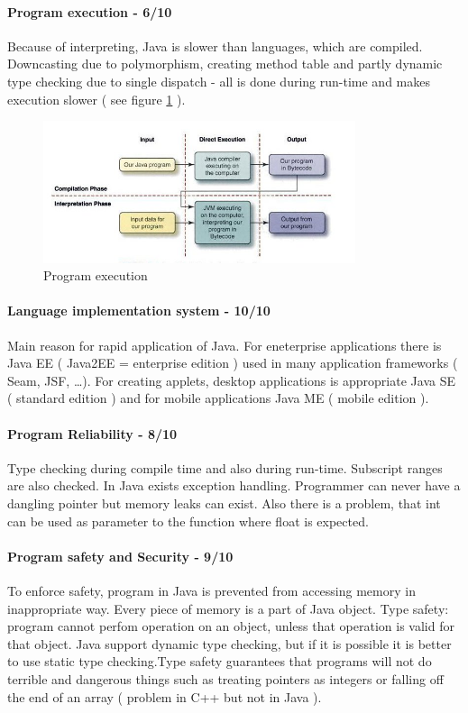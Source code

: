 \documentclass[5pt]{article}
\begin{document}
\paragraph{Program execution - 6/10}
Because of interpreting, Java is slower than languages, which are compiled.
Downcasting due to polymorphism, creating method table and partly dynamic type
checking due to single dispatch - all is done during run-time and makes
execution slower ( see figure \ref{fig:execution} ).

\begin{figure}[ht]
  \centering
  \includegraphics[height=1.64in,width=3.6in]{img/program_execution}
  \caption{Program execution}
  \label{fig:execution}
\end{figure}

\paragraph{Language implementation system - 10/10}
Main reason for rapid application of Java. For eneterprise applications there is
Java EE ( Java2EE = enterprise edition ) used in many application frameworks (
Seam, JSF, \ldots ). For creating applets, desktop applications is appropriate
Java SE ( standard edition ) and for mobile applications Java ME ( mobile
edition ).

\paragraph{Program Reliability - 8/10}
Type checking during compile time and also during run-time. Subscript ranges are
also checked. In Java exists exception handling. Programmer can never have a
dangling pointer but memory leaks can exist. Also there is a problem, that int
can be used as parameter to the function where float is expected.

\paragraph{Program safety and Security - 9/10}
To enforce safety, program in Java is prevented from accessing memory in
inappropriate way. Every piece of memory is a part of Java object. Type safety:
program cannot perfom operation on an object, unless that operation is valid for that
object. Java support dynamic type checking, but if it is possible it is better
to use static type checking.Type safety guarantees that programs will not do
terrible and dangerous things such as treating pointers as integers or falling
off the end of an array ( problem in C++ but not in Java ).
\end{document}
